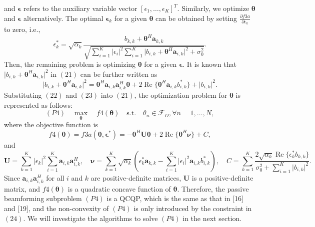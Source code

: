 \documentclass[review]{elsarticle}
\begin{document}
		and $\boldsymbol{\epsilon}$ refers to the auxiliary variable vector $[\epsilon_1, \ldots, \epsilon_K]^T$.
		Similarly, we optimize $\boldsymbol{\theta}$ and $\boldsymbol{\epsilon}$ alternatively. The optimal $\boldsymbol{\epsilon}_k$ for a given $\boldsymbol{\theta}$ can be obtained by setting $\frac{\partial f3a}{\partial \epsilon_k}$ to zero, i.e.,
		\[
		\epsilon_k^* = \sqrt{\alpha_k} \frac{{b_{k,k} + \boldsymbol{\theta}^H \mathbf{a}_{k,k}}}{{\sqrt{\sum_{i=1}^{K} \lvert \epsilon_i \rvert^2 \sum_{i=1}^{K} \lvert b_{i,k} + \boldsymbol{\theta}^H \mathbf{a}_{i,k} \rvert^2 + \sigma_0^2}}}.
		\]
		Then, the remaining problem is optimizing $\boldsymbol{\theta}$ for a given $\boldsymbol{\epsilon}$. It is known that $\lvert b_{i,k} + \boldsymbol{\theta}^H \mathbf{a}_{i,k} \rvert^2$ in $(21)$ can be further written as
		\[
		\lvert b_{i,k} + \boldsymbol{\theta}^H \mathbf{a}_{i,k} \rvert^2 = \boldsymbol{\theta}^H \mathbf{a}_{i,k} \mathbf{a}_{i,k}^H \boldsymbol{\theta} + 2\operatorname{Re} \{ \boldsymbol{\theta}^H \mathbf{a}_{i,k} b_{i,k}^* \} + \lvert b_{i,k} \rvert^2.
		\]
		Substituting $(22)$ and $(23)$ into $(21)$, the optimization problem for $\boldsymbol{\theta}$ is represented as follows:
		\[
		(P4) \quad \max_{\boldsymbol{\theta}} \quad f4(\boldsymbol{\theta}) \quad \text{s.t.} \quad \theta_n \in \mathcal{F}_D, \forall n = 1, \ldots, N,
		\]
		where the objective function is
		\[
		f4(\boldsymbol{\theta}) = f3a(\boldsymbol{\theta}, \boldsymbol{\epsilon}^*) = -\boldsymbol{\theta}^H \mathbf{U} \boldsymbol{\theta} + 2\operatorname{Re} \{ \boldsymbol{\theta}^H \boldsymbol{\nu} \} + C,
		\]
		and
		\[
		\mathbf{U} = \sum_{k=1}^{K} \lvert \epsilon_k \rvert^2 \sum_{i=1}^{K} \mathbf{a}_{i,k} \mathbf{a}_{i,k}^H, \quad \boldsymbol{\nu} = \sum_{k=1}^{K} \sqrt{\alpha_k} \left( \epsilon_k^* \mathbf{a}_{k,k} - \sum_{i=1}^{K} \lvert \epsilon_i \rvert^2 \mathbf{a}_{i,k} b_{i,k}^* \right), \quad C = \sum_{k=1}^{K} \frac{{2\sqrt{\alpha_k} \operatorname{Re} \{\epsilon_k^* b_{k,k}\}}}{{\sigma_0^2 + \sum_{i=1}^{K} \lvert b_{i,k} \rvert^2}}.
		\]
		Since $\mathbf{a}_{i,k} \mathbf{a}_{i,k}^H$ for all $i$ and $k$ are positive-definite matrices, $\mathbf{U}$ is a positive-definite matrix, and $f4(\boldsymbol{\theta})$ is a quadratic concave function of $\boldsymbol{\theta}$. Therefore, the passive beamforming subproblem $(P4)$ is a QCQP, which is the same as that in [16] and [19], and the non-convexity of $(P4)$ is only introduced by the constraint in $(24)$. We will investigate the algorithms to solve $(P4)$ in the next section.
		
\end{document}
